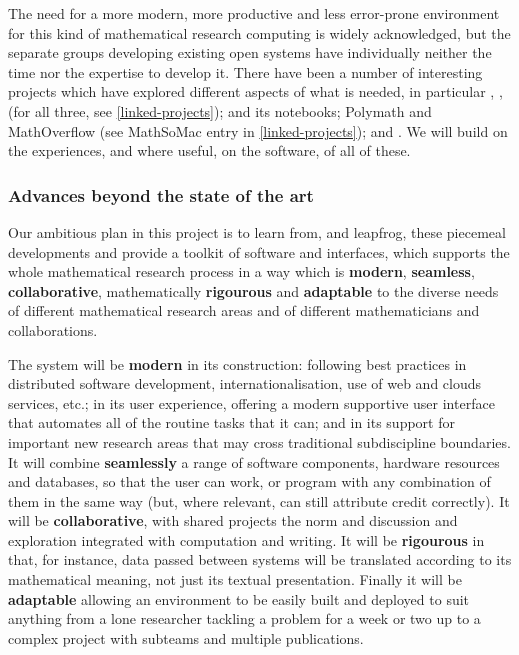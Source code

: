 The need for a more modern, more productive and less error-prone
environment for this kind of mathematical research computing is widely
acknowledged, but the separate groups developing existing open systems have
individually neither the time nor the expertise to develop it. There
have been a number of interesting projects which have explored
different aspects of what is needed, in particular
\SMC, \HPCGAP, \scienceproject (for all three, see \ref{linked-projects});
\Sage and its notebooks;
Polymath and MathOverflow (see MathSoMac entry in \ref{linked-projects});
and .
We will build on the experiences, and where useful, on the software,
of all of these.

\subsubsection{Advances beyond the state of the art}

Our ambitious plan in this project is to learn from, and leapfrog,
these piecemeal developments and provide a toolkit of software and
interfaces, which supports the whole mathematical research process in
a way which is \textbf{modern}, \textbf{seamless},
\textbf{collaborative}, mathematically \textbf{rigourous} and
\textbf{adaptable} to the diverse needs of different mathematical
research areas and of different mathematicians and collaborations.

The system will be \textbf{modern} in its construction: following best
practices in distributed software development, internationalisation,
use of web and clouds services, etc.; in its user experience, offering
a modern supportive user interface that automates all of the routine
tasks that it can; and in its support for important new research areas
that may cross traditional subdiscipline boundaries. It will combine
\textbf{seamlessly} a range of software components, hardware resources
and databases, so that the user can work, or program with any
combination of them in the same way (but, where relevant, can still
attribute credit correctly). It will be \textbf{collaborative}, with
shared projects the norm and discussion and exploration integrated
with computation and writing. It will be \textbf{rigourous} in that,
for instance, data passed between systems will be translated according
to its mathematical meaning, not just its textual
presentation. Finally it will be \textbf{adaptable} allowing an
environment to be easily built and deployed to suit anything from a
lone researcher tackling a problem for a week or two up to a complex
project with subteams and multiple publications.


